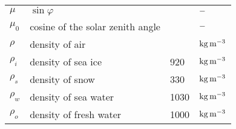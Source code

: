 \begin{tabular*}{\textwidth}{|l@{\extracolsep\fill}lll|}
$\mu$          & $\sin\varphi$                              &         & $\rm -$ \\
$\mu_0$   & cosine of the solar zenith angle           &         & $\rm -$ \\ 

$\rho$         & density of air                   &         & $\rm kg\,
m^{-3}$ \\
$\rho_i$  & density of sea ice                    & 920          & $\rm kg\, m^{-3}$
\\
$\rho_s$  & density of snow                       & 330          & $\rm kg\, m^{-3}$
\\
$\rho_w$  & density of sea water                  & 1030         & $\rm kg\,
m^{-3}$ \\
$\rho_o$  & density of fresh water                & 1000    & $\rm kg\, m^{-3}$
\\

\hline
\end{tabular*}
\newpage

